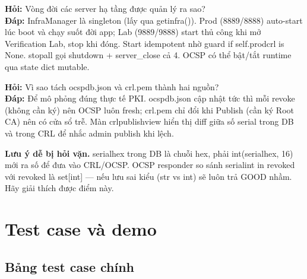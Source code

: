 \documentclass[12pt,a4paper]{article}
\newcommand{\code}[1]{{\ttfamily\small\def\_{\textunderscore\discretionary{}{}{}}#1}}
\begin{document}
\begin{qabox}
\textbf{Hỏi:} Vòng đời các server hạ tầng được quản lý ra sao?\\[2pt]
\textbf{Đáp:} \code{InfraManager} là singleton (lấy qua \code{get\_infra()}).
Prod (8889/8888) auto-start lúc boot và chạy suốt đời app; Lab (9889/9888) start
thủ công khi mở Verification Lab, stop khi đóng. Start idempotent nhờ guard
\code{if self.\_prod\_crl is None}. \code{stop\_all} gọi shutdown + server\_close
cả 4. OCSP có thể bật/tắt runtime qua state dict mutable.
\end{qabox}

\begin{qabox}
\textbf{Hỏi:} Vì sao tách \code{ocsp\_db.json} và \code{crl.pem} thành hai nguồn?
\\[2pt]
\textbf{Đáp:} Để mô phỏng đúng thực tế PKI. \code{ocsp\_db.json} cập nhật tức thì
mỗi revoke (không cần ký) nên OCSP luôn fresh; \code{crl.pem} chỉ đổi khi Publish
(cần ký Root CA) nên có cửa sổ trễ. Màn \code{crl\_publish\_view} hiển thị diff
giữa số serial trong DB và trong CRL để nhắc admin publish khi lệch.
\end{qabox}

\begin{warnbox}
\textbf{Lưu ý dễ bị hỏi vặn.} \code{serial\_hex} trong DB là chuỗi hex, phải
\code{int(serial\_hex, 16)} mới ra số để đưa vào CRL/OCSP. OCSP responder so
sánh \code{serial\_int in revoked} với \code{revoked} là \code{set[int]} ---
nếu lưu sai kiểu (str vs int) sẽ luôn trả GOOD nhầm. Hãy giải thích được điểm
này.
\end{warnbox}

\section{Test case và demo}

\subsection{Bảng test case chính}
\end{document}
